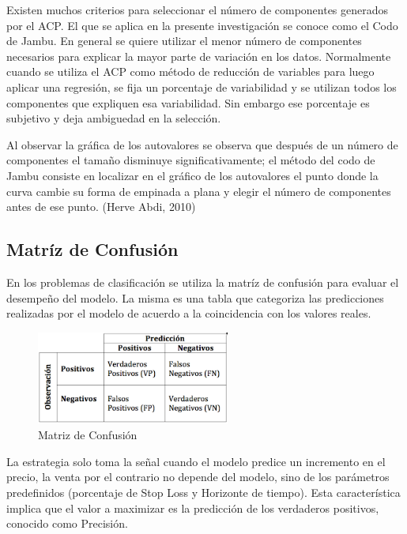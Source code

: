 \documentclass[a4paper,12pt]{Latex/Classes/PhDthesisPSnPDF}
\begin{document}
Existen muchos criterios para seleccionar el número de componentes generados por el ACP. El que se aplica en la presente investigación se conoce como el Codo de Jambu. En general se quiere utilizar el menor número de componentes necesarios para explicar la mayor parte de variación en los datos. Normalmente cuando se utiliza el ACP como método de reducción de variables para luego aplicar una regresión, se fija un porcentaje de variabilidad y se utilizan todos los componentes que expliquen esa variabilidad. Sin embargo ese porcentaje es subjetivo y deja ambiguedad en la selección. 

Al observar la gráfica de los autovalores se observa que después de un número de componentes el tamaño disminuye significativamente; el método del codo de Jambu consiste en localizar en el gráfico de los autovalores el punto donde la curva cambie su forma de empinada a plana y elegir el número de componentes antes de ese punto. (Herve Abdi, 2010)

\subsection{Matríz de Confusión}

En los problemas de clasificación se utiliza la matríz de confusión para evaluar el desempeño del modelo. La misma es una tabla que categoriza las predicciones realizadas por el modelo de acuerdo a la coincidencia con los valores reales. 

\begin{figure}[ht]
\begin{center}
\includegraphics[width=2.5in]{images/confusion_matrix}
\end{center}
\caption{Matriz de Confusión}
\end{figure}

La estrategia solo toma la señal cuando el modelo predice un incremento en el precio, la venta por el contrario no depende del modelo, sino de los parámetros predefinidos (porcentaje de Stop Loss y Horizonte de tiempo). Esta característica implica que el valor a maximizar es la predicción de los verdaderos positivos, conocido como Precisión.
\end{document}
